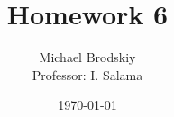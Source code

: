 


\title{Homework 6}
\date{\today}
\author{Michael Brodskiy\\ \small Professor: I. Salama}



\maketitle

